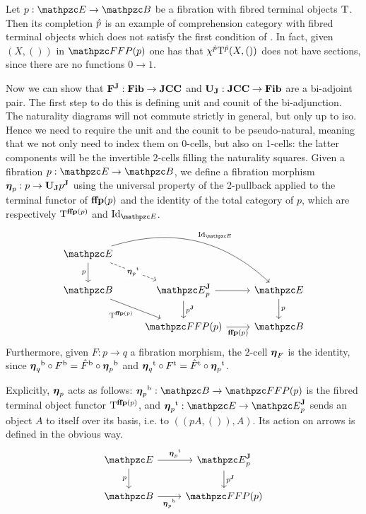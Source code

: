 \documentclass{lmcs} %
\theoremstyle{plain}\newtheorem{satz}[thm]{Satz} %
\begin{document}
			\begin{exa}\label{ex:cond1}
				Let $p:\ct{E}\to\ct{B}$ be a fibration with fibred terminal objects $\mathrm{T}^{}$. Then its completion $\hat{p}$ is an example of comprehension category with fibred terminal objects which does not satisfy the first condition of . In fact, given $(X,())$ in $\FFFP{p}$ one has that $\chi^{\hat{p}}\mathrm{T}^{\hat{p}}(X,())$ does not have sections, since there are no functions $\num{0}\to\num{1}$.
			\end{exa}

			Now we can show that $\mathbf{F^J}:\mathbf{Fib}\to\mathbf{JCC}$ and $\mathbf{U_J}:\mathbf{JCC}\to \mathbf{Fib}$ are a bi-adjoint pair. The first step to do this is defining unit and counit of the bi-adjunction. The naturality diagrams will not commute strictly in general, but only up to iso. Hence we need to require the unit and the counit to be pseudo-natural, meaning that we not only need to index them on 0-cells, but also on 1-cells: the latter components will be the invertible 2-cells filling the naturality squares.
			Given a fibration $p:\ct{E}\rightarrow \ct{B}$, we define a fibration morphism $\boldsymbol{\eta}_p:p\rightarrow \mathbf{U_J}{p}^{\mathbf{J}}$ using the universal property of the 2-pullback applied to the terminal functor of $\mathbf{ffp}(p)$ and the identity of the total category of $p$, which are respectively $\mathrm{T}^{\mathbf{ffp}(p)}$ and $\Id{\ct{E}}$.
			\[\begin{tikzcd}
				{\ct{E}} && \\
				{\ct{B}} & {\JDomE{p}} & {\ct{E}} \\
				& {\FFFP{p}} & {\ct{B}}
				\arrow["p"', from=1-1, to=2-1]
				\arrow["\ft{\twont{\eta}_p}"{description}, dashed, from=1-1, to=2-2]
				\arrow["{\Id{\ct{E}}}", from=1-1, to=2-3, bend left]
				\arrow["{\term{\fffp{p}}}"', from=2-1, to=3-2]
				\arrow[from=2-2, to=2-3]
				\arrow["{\JFib{p}}", from=2-2, to=3-2]
				\arrow["p", from=2-3, to=3-3]
				\arrow["{\fffp{p}}"', from=3-2, to=3-3]
			\end{tikzcd}\]
			Furthermore, given $F:p\to q$ a fibration morphism, the 2-cell $\boldsymbol{\eta}_F$ is the identity, since ${\boldsymbol{\eta}_q}^{\mathrm{b}}\circ {F}^{\mathrm{b}}={\hat{F}}^{\mathrm{b}}\circ{\boldsymbol{\eta}_p}^{\mathrm{b}}$ and ${\boldsymbol{\eta}_q}^{\mathrm{t}}\circ {F}^{\mathrm{t}}={\hat{F}}^{\mathrm{t}}\circ{\boldsymbol{\eta}_p}^{\mathrm{t}}$. 
			
Explicitly, $\boldsymbol{\eta}_p$ acts as follows:
$\fb{\twont{\eta}_p}:\ct{B}\rightarrow\FFFP{p}$ is the fibred terminal object functor $\mathrm{T}^{\mathbf{ffp}(p)}$, and $\ft{\twont{\eta}_p}:\ct{E}\rightarrow \JDomE{p}$ sends an object $A$ to itself over its basis, i.e. to $((pA,()), A)$. Its action on arrows is defined in the obvious way.
			\[\begin{tikzcd}
				{\ct{E}} & {\JDomE{p}} \\
				{\ct{B}} & {\FFFP{p}}
				\arrow["{\ft{\twont{\eta}_p}}", from=1-1, to=1-2]
				\arrow["p"', from=1-1, to=2-1]
				\arrow["{\JFib{p}}", from=1-2, to=2-2]
				\arrow["\fb{\twont{\eta}_p}"', from=2-1, to=2-2]
			\end{tikzcd}\]
	
\end{document}
